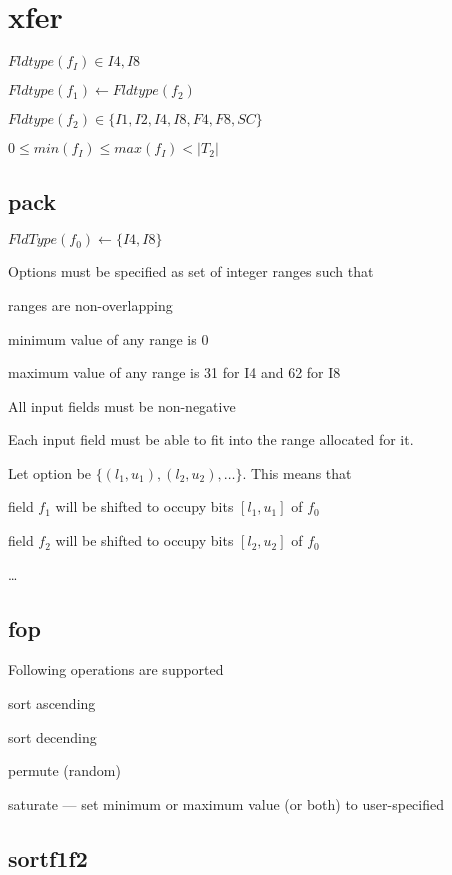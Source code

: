 \section{xfer}
\label{xfer}
\bi
\item \(Fldtype(f_I) \in {I4, I8}\) 
\item \(Fldtype(f_1) \leftarrow Fldtype(f_2)\) 
\item \(Fldtype(f_2) \in \{I1, I2, I4,  I8, F4, F8, SC\}\)
\item \(0 \leq min(f_I) \leq max(f_I) < |T_2|\)
\ei

\subsection{pack}
\label{pack}

\be
\item \(FldType(f_0) \leftarrow \{I4, I8\}\) 
\item Options must be specified as set of integer ranges such that 
\be
\item ranges are non-overlapping 
\item minimum value of any range is 0
\item maximum value of any range is 31 for I4 and 62 for I8
\item All input fields must be non-negative
\item Each input field must be able to fit into the range allocated for it.
\ee

Let option be  \(\{(l_1, u_1), (l_2, u_2), \ldots\}\). This means that
\be
\item field \(f_1\) will be shifted to occupy bits \([l_1, u_1]\) of \(f_0\) 
\item field \(f_2\) will be shifted to occupy bits \([l_2, u_2]\) of \(f_0\) 
\item \ldots
\ee

\ee


\subsection{fop}
\label{fop}

Following operations are supported
\be
\item sort ascending 
\item sort decending 
\item permute (random)
\item saturate --- set minimum or maximum value (or both) to user-specified
\ee

\subsection{sortf1f2}
\label{sortf1f2}

